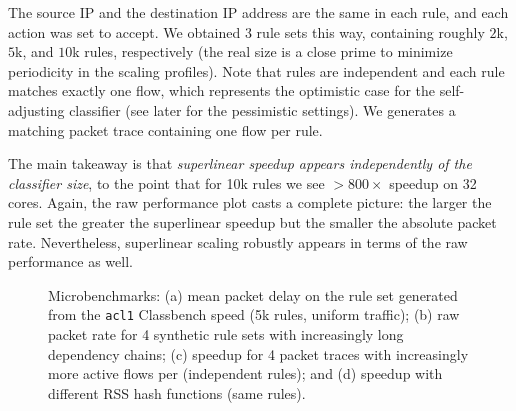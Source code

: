 \noindent %
The source IP and the destination IP address are the same in each rule, and each action was set to accept. We obtained 3 rule sets this way, containing roughly $2$k, $5$k, and $10$k rules, respectively (the real size is a close prime to minimize periodicity in the scaling profiles). Note that rules are independent and each rule matches exactly one flow, which represents the optimistic case for the self-adjusting classifier (see later for the pessimistic settings). We generates a matching packet trace containing one flow per rule.

The main takeaway is that \emph{superlinear speedup appears independently of the classifier size}, to the point that for 10k rules we see $>800\times$ speedup on 32 cores. Again, the raw performance plot casts a complete picture: the larger the rule set the greater the superlinear speedup but the smaller the absolute packet rate. Nevertheless, superlinear scaling robustly appears in terms of the raw performance as well.

\begin{figure*}[t]
  \centering
  \hspace{-1.4em}
  \hspace{-1.4em}
  \hspace{-1.4em}
  \caption{Microbenchmarks: (a) mean packet delay on the rule set generated from the \texttt{acl1} Classbench speed (5k rules, uniform traffic); (b) raw packet rate for 4 synthetic rule sets with increasingly long dependency chains; (c) speedup for 4 packet traces with increasingly more active flows per (independent rules); and (d) speedup with different RSS hash functions (same rules).}
  \label{fig:microbenchmark}
\end{figure*}

